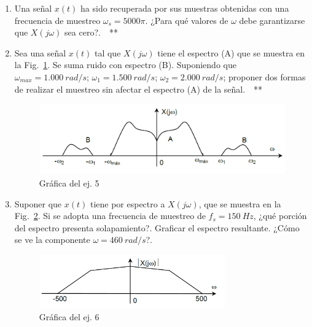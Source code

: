 \documentclass[10pt,a4paper]{article}
\begin{document}
\begin{enumerate}
\item {Una señal $x(t)$ ha sido recuperada por sus muestras obtenidas con una frecuencia de muestreo 
$\omega_s=5000\pi$. ¿Para qué valores de $\omega$ debe garantizarse que $X(j\omega)$ sea cero?}.~~**

\item {Sea una señal $x(t)$ tal que $X(j\omega)$ tiene el espectro (A) que se muestra en la Fig.~\ref{fig:ej_5}. Se 
suma ruido con espectro (B). Suponiendo que 	$\omega_{max}=1.000~rad/s$; $\omega_{1}=1.500~rad/s$; 
$\omega_{2}=2.000~rad/s$; proponer dos formas de realizar el muestreo sin afectar el espectro (A) de la señal.}~~**

\begin{figure}[h]
	\begin{center}
		\includegraphics[width=12cm]{tp8_ej5.png}
	\end{center}
	\caption{Gráfica del ej. 5}
	\label{fig:ej_5}
\end{figure}

\item {Suponer que $x(t)$ tiene por espectro a $X(j\omega)$, que se muestra en la Fig.~\ref{fig:ej_6}. Si se adopta una 
frecuencia de muestreo de $f_s=150~Hz$, ¿qué porción del espectro presenta solapamiento?. Graficar el espectro 
resultante. ¿Cómo se ve la componente $\omega=460~rad/s$?}.

\begin{figure}[h]
	\begin{center}
		\includegraphics[width=8cm]{tp8_ej6.png}
	\end{center}
	\caption{Gráfica del ej. 6}
	\label{fig:ej_6}
\end{figure}


\end{enumerate}
\end{document}
